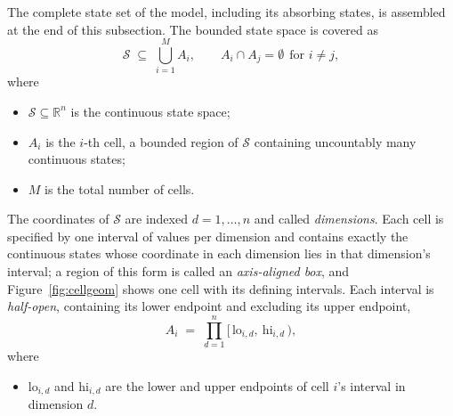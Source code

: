 \documentclass[11pt,a4paper]{article}
\newcommand{\R}{\mathbb{R}}
\theoremstyle{plain}
\theoremstyle{remark}
\begin{document}
	The complete state set of the model, including its absorbing states,
	is assembled at the end of this subsection. The bounded state space is
	covered as
	\begin{equation}
		\mathcal{S} \;\subseteq\; \bigcup_{i=1}^{M} A_i, \qquad
		A_i \cap A_j = \emptyset \ \ \text{for } i \neq j,
		\label{eq:partition}
	\end{equation}
	where
	\begin{itemize}
		\item $\mathcal{S} \subseteq \R^n$ is the continuous state space;
		\item $A_i$ is the $i$-th cell, a bounded region of $\mathcal{S}$
		containing uncountably many continuous states;
		\item $M$ is the total number of cells.
	\end{itemize}
	
	The coordinates of $\mathcal{S}$ are indexed $d = 1, \dots, n$ and
	called \emph{dimensions}. Each cell is specified by one interval of
	values per dimension and contains exactly the continuous states whose
	coordinate in each dimension lies in that dimension's interval; a
	region of this form is called an \emph{axis-aligned box}, and
	Figure~\ref{fig:cellgeom} shows one cell with its defining intervals. \newline
	Each interval is \emph{half-open}, containing its lower endpoint and
	excluding its upper endpoint,
	\begin{equation}
		A_i \;=\; \prod_{d=1}^{n} \bigl[\, \mathrm{lo}_{i,d},\ \mathrm{hi}_{i,d} \,\bigr),
		\label{eq:cellbox}
	\end{equation}
	where
	\begin{itemize}
		\item $\mathrm{lo}_{i,d}$ and $\mathrm{hi}_{i,d}$ are the lower and
		upper endpoints of cell $i$'s interval in dimension $d$.
	\end{itemize}
	
\end{document}

